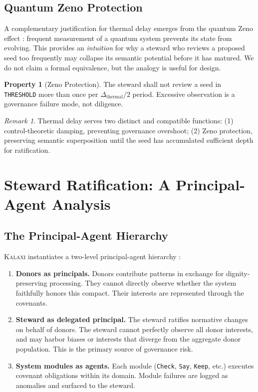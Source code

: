 \documentclass[12pt,a4paper]{article}
\theoremstyle{definition}
\newtheorem{property}{Property}[section]
\theoremstyle{remark}
\newtheorem{remark}{Remark}[section]
\newcommand{\kalaxi}{\textsc{Kalaxi}}
\begin{document}
\subsection{Quantum Zeno Protection}

A complementary justification for thermal delay emerges from the quantum Zeno effect
\cite{misra1977}: frequent measurement of a quantum system prevents its state from
evolving. This provides an \emph{intuition} for why a steward who reviews a proposed
seed too frequently may collapse its semantic potential before it has matured. We do
not claim a formal equivalence, but the analogy is useful for design.

\begin{property}[Zeno Protection]
The steward shall not review a seed in \texttt{THRESHOLD} more than once per
$\Delta_\text{thermal}/2$ period. Excessive observation is a governance failure mode,
not diligence.
\end{property}

\begin{remark}
Thermal delay serves two distinct and compatible functions: (1) control-theoretic
damping, preventing governance overshoot; (2) Zeno protection, preserving semantic
superposition until the seed has accumulated sufficient depth for ratification.
\end{remark}

\section{Steward Ratification: A Principal-Agent Analysis}
\label{sec:steward}

\subsection{The Principal-Agent Hierarchy}

\kalaxi{} instantiates a two-level principal-agent hierarchy \cite{holmstrom1979}:

\begin{enumerate}
\item \textbf{Donors as principals.} Donors contribute patterns in exchange for
  dignity-preserving processing. They cannot directly observe whether the system
  faithfully honors this compact. Their interests are represented through the covenants.

\item \textbf{Steward as delegated principal.} The steward ratifies normative changes
  on behalf of donors. The steward cannot perfectly observe all donor interests, and
  may harbor biases or interests that diverge from the aggregate donor population.
  This is the primary source of governance risk.

\item \textbf{System modules as agents.} Each module (\texttt{Check}, \texttt{Say},
  \texttt{Keep}, etc.) executes covenant obligations within its domain. Module failures
  are logged as anomalies and surfaced to the steward.
\end{enumerate}
\end{document}
